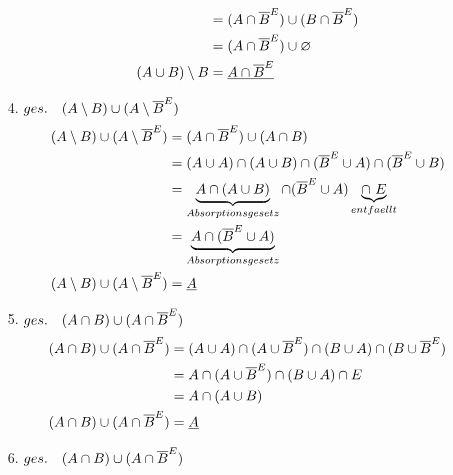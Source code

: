 \begin{itemize}
\begin{align*}
                                                   & = (A \cap \overline{B}^E) \cup (B \cap \overline{B}^E) \\
                                                   & = (A \cap \overline{B}^E) \cup \varnothing \\
                            (A \cup B) \setminus B & = \underline{A \cap \overline{B}^E} \\                      
                        \end{align*}
                    \item[4.] $ges.\quad (A \setminus B) \cup (A \setminus \overline{B}^E)$ %
                        \begin{align*}
                            (A \setminus B) \cup (A \setminus \komplement{B}) & = (A \cap \komplement{B}) \cup (A \cap B) \\
                            & = (A \cup A) \cap (A \cup B) \cap (\komplement{B} \cup A) \cap (\komplement{B} \cup B) \\
                            & = \underbrace{A \cap (A \cup B)}_{Absorptionsgesetz} \cap (\komplement{B} \cup A) \underbrace{\cap \ E}_{entfaellt} \\
                            & = \underbrace{A \cap (\komplement{B} \cup A)}_{Absorptionsgesetz} \\
                            (A \setminus B) \cup (A \setminus \komplement{B}) & = \underline{A} \\
                        \end{align*}
                    \item[5.] $ges.\quad (A \cap B) \cup (A \cap \overline{B}^E)$  
                        \begin{align*}
                            (A \cap B) \cup (A \cap \overline{B}^E) & = (A \cup A) \cap (A \cup \overline{B}^E) \cap (B \cup A) \cap (B \cup \overline{B}^E) \\
                                                                    & = A \cap (A \cup \overline{B}^E) \cap (B \cup A) \cap E \\
                                                                    & = A \cap (A \cup B) \\
                            (A \cap B) \cup (A \cap \overline{B}^E) & = \underline{A}                                       
                        \end{align*}
                    \item[6.] $ges.\quad (A \cap B) \cup (A \cap \overline{B}^E)$  

\end{itemize}
